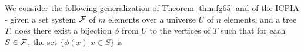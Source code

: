 \documentclass[envcountsect, envcountsame, 11pt]{../lib/llncs2e/llncs}
\def\cF{{\cal F}}
\begin{document}
\begin{comment}
\noindent
Consecutive ones property (COP) of binary matrices is a widely studied
combinatorial problem. The first mention of COP, according to D.G. Kendall  \cite{dk69}, was made by Petrie, an archaeologist, in 1899. The problem is to rearrange rows (columns) of a
binary matrix in such a way that every column (row) has its $1$s occur
consecutively. If this is possible the matrix is said to have the COP.
This problem has several practical applications in diverse fields
including scheduling \cite{hl06}, information retrieval \cite{k77} and
computational biology \cite{abh98}.  Further, it is a tool in graph
theory \cite{mcg04} for interval graph recognition, characterization
of Hamiltonian graphs, and in integer linear programming
\cite{ht02,hl06}.    

The recognition of COP is polynomial time solvable by
a rich class of algorithms. Some heuristics were proposed for testing the COP in \cite{wsr51} before the work of Fulkerson and Gross \cite{fg65} who presented the first polynomial time algorithm.   Subsequently Tucker \cite{at72}  presented a characterization of matrices with the COP
based on certain forbidden matrix configurations.  
Booth and Leuker's PQ trees \cite{bl76}, PC trees invented by Hsu \cite{wlh01,wlh02}, and PQR trees by Meidanis and
Munuera \cite{mm09},  are data structures to encode the class of
permutations that realize COP for a given binary matrix.  Specifically PQ trees
also find application in other algorithms like planarity testing algorithms.  
PC-trees were used to test if a binary matrix has the CiRcular Ones Property (CROP).   PQR tree were designed to provide a witness, via the R nodes, when the input binary matrix did not have the COP.  McConnell in \cite{mcc04} transformed the problem for testing for COP to the problem of testing if a transformed graph was bipartite, thus providing a witness for the absence of COP.    Finally, an ICPIA was constructed by adapting the prime matrix decomposition ideas of Hsu \cite{wlh02}.   While the consecutive ones testing algorithm in \cite{nsnrs09} is same as the one presented in
\cite{wlh02}, the ICPIA provides a natural way of generalizing the COP of binary matrices.
\end{comment}
We consider the following generalization of  Theorem \ref{thm:fg65} and of the ICPIA \cite{nsnrs09}- given a set system $\cF$
of $m$ elements over a universe $U$ of $n$ elements, and a tree $T$, does there exist a bijection $\phi$ from
$U$ to the vertices of $T$ such that for each $S \in \cF$, the set $\{\phi(x) | x \in S\}$ is
\end{document}
